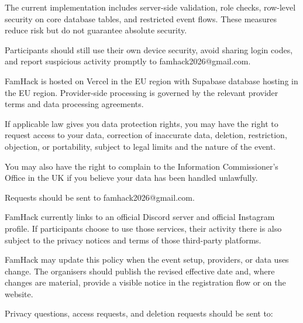 \documentclass[11pt]{article}
\begin{document}

The current implementation includes server-side validation, role checks, row-level security on core database tables, and restricted event flows. These measures reduce risk but do not guarantee absolute security.

Participants should still use their own device security, avoid sharing login codes, and report suspicious activity promptly to famhack2026@gmail.com.

FamHack is hosted on Vercel in the EU region with Supabase database hosting in the EU region. Provider-side processing is governed by the relevant provider terms and data processing agreements.

If applicable law gives you data protection rights, you may have the right to request access to your data, correction of inaccurate data, deletion, restriction, objection, or portability, subject to legal limits and the nature of the event.

You may also have the right to complain to the Information Commissioner's Office in the UK if you believe your data has been handled unlawfully.

Requests should be sent to famhack2026@gmail.com.

FamHack currently links to an official Discord server and official Instagram profile. If participants choose to use those services, their activity there is also subject to the privacy notices and terms of those third-party platforms.

FamHack may update this policy when the event setup, providers, or data uses change. The organisers should publish the revised effective date and, where changes are material, provide a visible notice in the registration flow or on the website.

Privacy questions, access requests, and deletion requests should be sent to:

\end{document}
